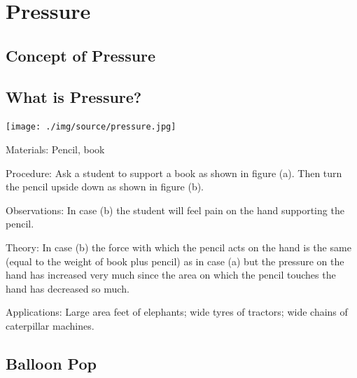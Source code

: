 \section{Pressure}
\label{sec:pressure}

\begin{multicols}{2}


\section*{Concept of Pressure}


\subsection{What is Pressure?}

\begin{center}
\texttt{[image: ./img/source/pressure.jpg]}
\end{center}

\begin{description*}
\item[Materials:]{Pencil, book}
\item[Procedure:]{Ask a student to support a book as shown in figure (a). Then turn the pencil upside down
as shown in figure (b).}
\item[Observations:]{In case (b) the student will feel pain on the hand supporting the pencil.}
\item[Theory:]{In case (b) the force with which the pencil acts on the hand is the same (equal to the
weight of book plus pencil) as in case (a) but the pressure on the hand has increased very
much since the area on which the pencil touches the hand has decreased so much.}
\item[Applications:]{Large area feet of elephants; wide tyres of tractors; wide chains of caterpillar machines.}
\end{description*}


\subsection{Balloon Pop}


\end{multicols}
